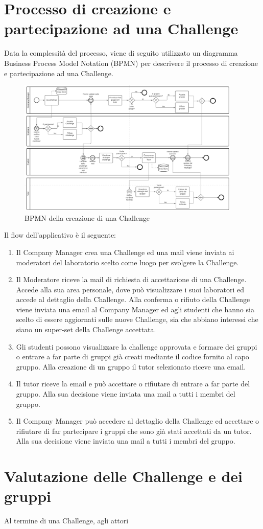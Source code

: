 \section{Processo di creazione e partecipazione ad una Challenge}

Data la complessità del processo, viene di seguito utilizzato un diagramma Business Process Model Notation (BPMN) per descrivere il processo di creazione e partecipazione ad una Challenge. 

\begin{figure}[H]
    \centering
        \includegraphics[width=0.95\textwidth]{images/BPMN_Challenge.png}
    \caption{BPMN della creazione di una Challenge}
    \label{fig:BPMN_Challenge}
\end{figure}


Il flow dell'applicativo è il seguente:
\begin{enumerate}
    \item Il Company Manager crea una Challenge ed una mail viene inviata ai moderatori del laboratorio scelto come luogo per svolgere la Challenge.
    \item Il Moderatore riceve la mail di richiesta di accettazione di una Challenge. Accede alla sua area personale, dove può visualizzare i suoi laboratori ed accede al dettaglio della Challenge. Alla conferma o rifiuto della Challenge viene inviata una email al Company Manager ed agli studenti che hanno sia scelto di essere aggiornati sulle nuove Challenge, sia che abbiano interessi che siano un super-set della Challenge accettata.
    \item Gli studenti possono visualizzare la challenge approvata e formare dei gruppi o entrare a far parte di gruppi già creati mediante il codice fornito al capo gruppo. Alla creazione di un gruppo il tutor selezionato riceve una email.
    \item Il tutor riceve la email e può accettare o rifiutare di entrare a far parte del gruppo. Alla sua decisione viene inviata una mail a tutti i membri del gruppo.
    \item Il Company Manager può accedere al dettaglio della Challenge ed accettare o rifiutare di far partecipare i gruppi che sono già stati accettati da un tutor. Alla sua decisione viene inviata una mail a tutti i membri del gruppo.
\end{enumerate}


\section{Valutazione delle Challenge e dei gruppi}

Al termine di una Challenge, agli attori 
\clearpage
